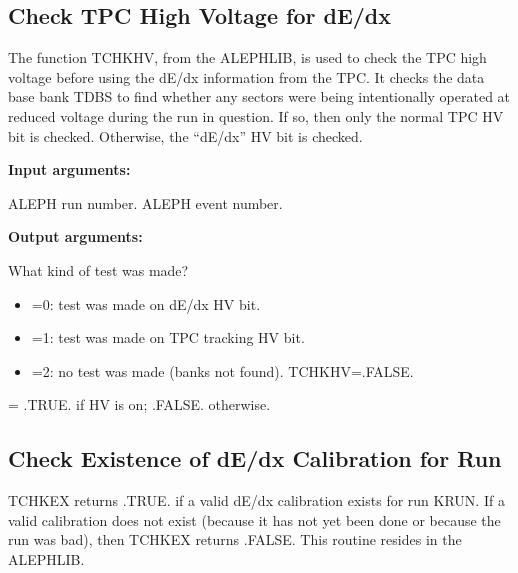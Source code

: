 \subsection{\label{sec-OARDEDV}Check TPC High Voltage for dE/dx}
\par
{}
\par
The function TCHKHV, from the ALEPHLIB, is used to check the
TPC high voltage before using the dE/dx information from the TPC.
It checks the data base bank TDBS to find whether any sectors
were being intentionally
operated at reduced voltage during the run in question.
If so, then only the normal TPC HV bit is checked.
Otherwise, the ``dE/dx'' HV bit is checked.
\par
{\bf Input arguments:}
\begin{indentlist}{ 3.50cm}{ 3.75cm}
ALEPH run number.
ALEPH event number.
\end{indentlist}
\par
{\bf Output arguments:}
\begin{indentlist}{ 3.50cm}{ 3.75cm}
What kind of test was made?
\begin{itemize}
\item =0:  test was made on dE/dx HV bit.
\item =1:  test was made on TPC tracking HV bit.
\item =2:  no test was made (banks not found).  TCHKHV=.FALSE.
\end{itemize}
 = .TRUE. if HV is on; .FALSE. otherwise.
\end{indentlist}
\par
\subsection{\label{sec-OARDEDE}Check Existence of dE/dx Calibration
for Run}
\par
{}
\par
TCHKEX returns .TRUE. if a valid
dE/dx calibration exists for run KRUN.  If a valid calibration
does not exist (because it has not yet been done or because
the run was bad), then TCHKEX returns .FALSE.
This routine resides in the ALEPHLIB.
\par
